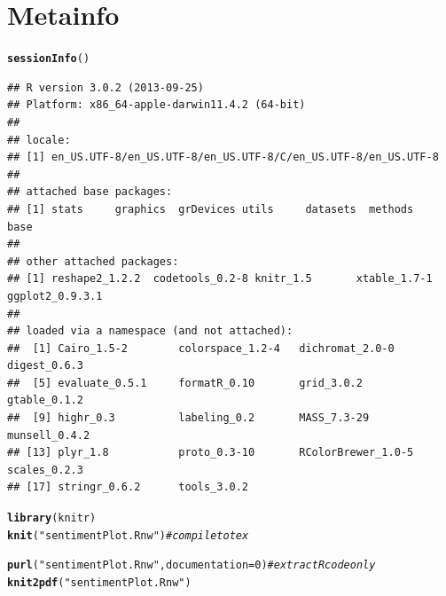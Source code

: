 \documentclass{article}\usepackage[]{graphicx}\usepackage[]{color}
\makeatletter
\newcommand{\hlnum}[1]{\textcolor[rgb]{0.686,0.059,0.569}{#1}}%
\newcommand{\hlstr}[1]{\textcolor[rgb]{0.192,0.494,0.8}{#1}}%
\newcommand{\hlcom}[1]{\textcolor[rgb]{0.678,0.584,0.686}{\textit{#1}}}%
\newcommand{\hlstd}[1]{\textcolor[rgb]{0.345,0.345,0.345}{#1}}%
\newcommand{\hlkwc}[1]{\textcolor[rgb]{0.333,0.667,0.333}{#1}}%
\newcommand{\hlkwd}[1]{\textcolor[rgb]{0.737,0.353,0.396}{\textbf{#1}}}%
\newenvironment{kframe}{%
 \def\at@end@of@kframe{}%
 \ifinner\ifhmode%
  \def\at@end@of@kframe{\end{minipage}}%
  \begin{minipage}{\columnwidth}%
 \fi\fi%
 \def\FrameCommand##1{\hskip\@totalleftmargin \hskip-\fboxsep
 \colorbox{shadecolor}{##1}\hskip-\fboxsep
     \hskip-\linewidth \hskip-\@totalleftmargin \hskip\columnwidth}%
 \MakeFramed {\advance\hsize-\width
   \@totalleftmargin\z@ \linewidth\hsize
   \@setminipage}}%
 {\par\unskip\endMakeFramed%
 \at@end@of@kframe}
\newenvironment{knitrout}{}{} %
\makeatother
\begin{document}
\section{Metainfo}
\begin{knitrout}
\color{fgcolor}\begin{kframe}
\begin{alltt}
\hlkwd{sessionInfo}\hlstd{()}
\end{alltt}
\begin{verbatim}
## R version 3.0.2 (2013-09-25)
## Platform: x86_64-apple-darwin11.4.2 (64-bit)
## 
## locale:
## [1] en_US.UTF-8/en_US.UTF-8/en_US.UTF-8/C/en_US.UTF-8/en_US.UTF-8
## 
## attached base packages:
## [1] stats     graphics  grDevices utils     datasets  methods   base     
## 
## other attached packages:
## [1] reshape2_1.2.2  codetools_0.2-8 knitr_1.5       xtable_1.7-1    ggplot2_0.9.3.1
## 
## loaded via a namespace (and not attached):
##  [1] Cairo_1.5-2        colorspace_1.2-4   dichromat_2.0-0    digest_0.6.3      
##  [5] evaluate_0.5.1     formatR_0.10       grid_3.0.2         gtable_0.1.2      
##  [9] highr_0.3          labeling_0.2       MASS_7.3-29        munsell_0.4.2     
## [13] plyr_1.8           proto_0.3-10       RColorBrewer_1.0-5 scales_0.2.3      
## [17] stringr_0.6.2      tools_3.0.2
\end{verbatim}
\end{kframe}
\end{knitrout}


\begin{knitrout}
\color{fgcolor}\begin{kframe}
\begin{alltt}
\hlkwd{library}\hlstd{(knitr)}
\hlkwd{knit}\hlstd{(}\hlstr{"sentimentPlot.Rnw"}\hlstd{)}  \hlcom{# compile to tex}
\end{alltt}


{\ttfamily\noindent\bfseries\color{errorcolor}{\#\# Error: duplicate label 'setup'}}\begin{alltt}
\hlkwd{purl}\hlstd{(}\hlstr{"sentimentPlot.Rnw"}\hlstd{,} \hlkwc{documentation} \hlstd{=} \hlnum{0}\hlstd{)}  \hlcom{# extract R code only}
\hlkwd{knit2pdf}\hlstd{(}\hlstr{"sentimentPlot.Rnw"}\hlstd{)}
\end{alltt}


{\ttfamily\noindent\bfseries\color{errorcolor}{\#\# Error: duplicate label 'setup'}}\end{kframe}
\end{knitrout}
\end{document}
